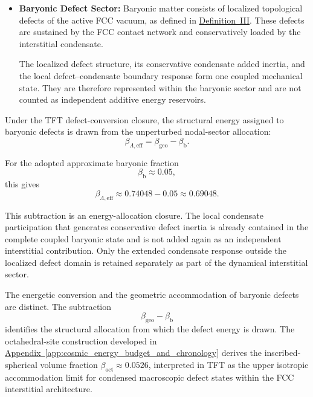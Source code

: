 \begin{itemize}
    \item \textbf{Baryonic Defect Sector:}
    Baryonic matter consists of localized topological defects of the active FCC vacuum, as defined in \hyperref[def:definition_three]{Definition~III}. These defects are sustained by the FCC contact network and conservatively loaded by the interstitial condensate.

    The localized defect structure, its conservative condensate added inertia, and the local defect--condensate boundary response form one coupled mechanical state. They are therefore represented within the baryonic sector and are not counted as independent additive energy reservoirs.
\end{itemize}

Under the TFT defect-conversion closure, the structural energy assigned to baryonic defects is drawn from the unperturbed nodal-sector allocation:
\begin{equation}
    \beta_{\Lambda,\mathrm{eff}} = \beta_{\mathrm{geo}} - \beta_{\mathrm{b}}.
\end{equation}

For the adopted approximate baryonic fraction
\begin{equation}
    \beta_{\mathrm{b}} \approx 0.05,
\end{equation}
this gives
\begin{equation}
    \beta_{\Lambda,\mathrm{eff}} \approx 0.74048-0.05 \approx 0.69048.
\end{equation}

This subtraction is an energy-allocation closure. The local condensate participation that generates conservative defect inertia is already contained in the complete coupled baryonic state and is not added again as an independent interstitial contribution. Only the extended condensate response outside the localized defect domain is retained separately as part of the dynamical interstitial sector.

The energetic conversion and the geometric accommodation of baryonic defects are distinct. The subtraction
\begin{equation}
    \beta_{\mathrm{geo}}-\beta_{\mathrm{b}}
\end{equation}
identifies the structural allocation from which the defect energy is drawn. The octahedral-site construction developed in \hyperref[app:cosmic_energy_budget_and_chronology]{Appendix~\ref*{app:cosmic_energy_budget_and_chronology}} derives the inscribed-spherical volume fraction $\beta_{\mathrm{oct}} \approx 0.0526$, interpreted in TFT as the upper isotropic accommodation limit for condensed macroscopic defect states within the FCC interstitial architecture.

